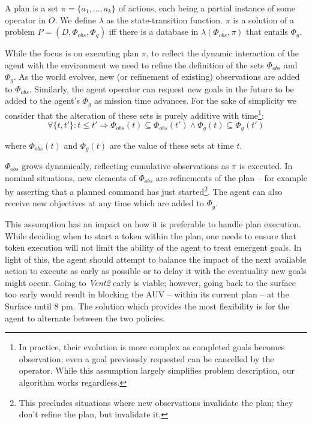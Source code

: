 \begin{definition}
  \label{def:plan}
  A plan is a set $\pi = \{a_1,...,a_k\}$ of actions, each being a
  partial instance of some operator in $O$.  We define $\lambda$ as
  the state-transition function.  $\pi$ is a solution of a problem $P
  = (D, \Phi_{obs}, \Phi_g)$ iff there is a database in $\lambda(\Phi_{obs},
  \pi)$ that entails $\Phi_g$.
\end{definition}
 
While the focus is on executing plan $\pi$, to reflect the dynamic
interaction of the agent with the environment we need to refine the
definition of the sets $\Phi_{obs}$ and $\Phi_g$. As the world
evolves, new (or refinement of existing) observations are added to
$\Phi_{obs}$. Similarly, the agent operator can request new goals in
the future to be added to the agent's $\Phi_g$ as mission time
advances. For the sake of simplicity we consider that the alteration
of these sets is purely additive with time\footnote{In practice, their
  evolution is more complex as completed goals becomes observation;
  even a goal previously requested can be cancelled by the
  operator. While this assumption largely simplifies problem
  description, our algorithm works regardless.}:
\[ \forall \{t, t'\}: t \le t' \Rightarrow \Phi_{obs}(t) \subseteq \Phi_{obs}(t')
\wedge \Phi_g(t) \subseteq \Phi_g(t') \] 

where $\Phi_{obs}(t)$ and $\Phi_g(t)$ are the value of these sets at
time $t$.

$\Phi_{obs}$ grows dynamically, reflecting cumulative observations as
$\pi$ is executed. In nominal situations, new elements of $\Phi_{obs}$
are refinements of the plan -- for example by asserting that a planned
command has just started\footnote{This precludes situations where new
  observations invalidate the plan; they don't refine the plan, but
  invalidate it.}. The agent can also receive new objectives at any
time which are added to $\Phi_g$. 

This assumption has an impact on how it is preferable to handle plan
execution. While deciding when to start a token within the plan, one
needs to ensure that token execution will not limit the ability of the
agent to treat emergent goals. In light of this, the agent should
attempt to balance the impact of the next available action to execute
as early as possible or to delay it with the eventuality new goals
might occur. Going to \emph{Vent2} early is viable; however, going
back to the surface too early would result in blocking the AUV --
within its current plan -- at the Surface until $8$ pm. The solution
which provides the most flexibility is for the agent to alternate
between the two policies.

